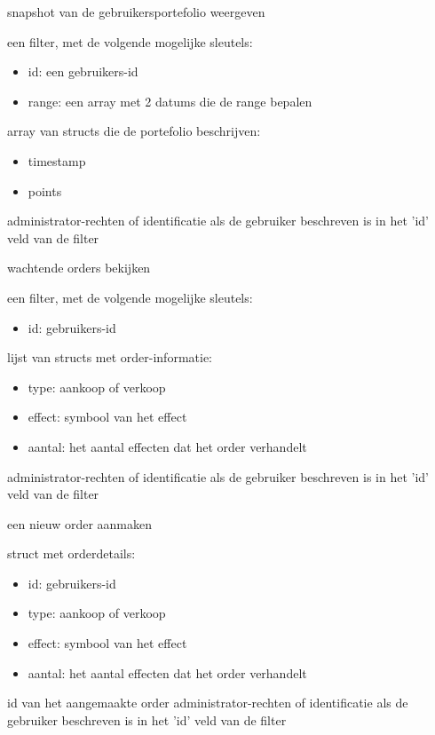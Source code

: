 	{ snapshot van de gebruikersportefolio weergeven }
	{ een filter, met de volgende mogelijke sleutels:
		\begin{itemize}
		\item{id: een gebruikers-id}
		\item{range: een array met 2 datums die de range bepalen}
		\end{itemize} }
	{ array van structs die de portefolio beschrijven:
		\begin{itemize}
		\item{timestamp}
		\item{points}
		\end{itemize} }
	{ administrator-rechten of identificatie als de gebruiker beschreven is in het 'id' veld van de filter }

	{ wachtende orders bekijken }
	{ een filter, met de volgende mogelijke sleutels:
		\begin{itemize}
		\item{id: gebruikers-id}
		\end{itemize} }
	{ lijst van structs met order-informatie:
		\begin{itemize}
		\item{type: aankoop of verkoop}
		\item{effect: symbool van het effect}
		\item{aantal: het aantal effecten dat het order verhandelt}
		\end{itemize} }
	{ administrator-rechten of identificatie als de gebruiker beschreven is in het 'id' veld van de filter }

	{ een nieuw order aanmaken }
	{ struct met orderdetails:
		\begin{itemize}
		\item{id: gebruikers-id}
		\item{type: aankoop of verkoop}
		\item{effect: symbool van het effect}
		\item{aantal: het aantal effecten dat het order verhandelt}
		\end{itemize} }
	{ id van het aangemaakte order }
	{ administrator-rechten of identificatie als de gebruiker beschreven is in het 'id' veld van de filter }

